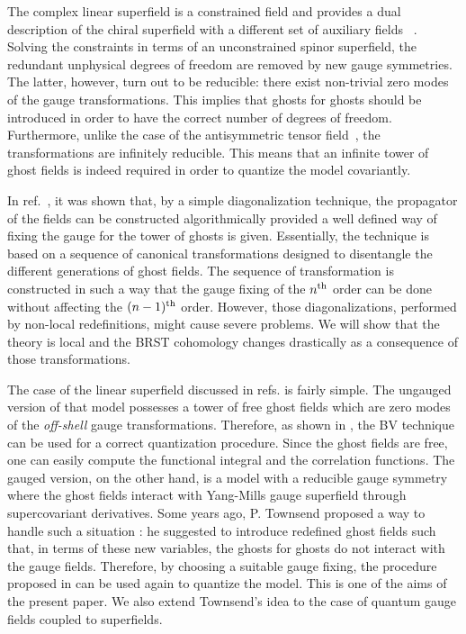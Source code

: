 \documentclass[a4paper,12pt]{article}
\begin{document}
The complex linear superfield is a constrained field and provides a
dual description of the chiral superfield with a different set of
auxiliary fields ~\cite{gates,superspace,WZNW,YMSG,Deo}.  Solving the
constraints in terms of an unconstrained spinor superfield, the
redundant unphysical degrees of freedom are removed by new gauge
symmetries. The latter, however, turn out to be reducible: there exist
non-trivial zero modes of the gauge transformations.  This implies
that ghosts for ghosts should be introduced in order to have the
correct number of degrees of freedom. Furthermore, unlike the case of
the antisymmetric tensor field~\cite{AT}, the transformations are
infinitely reducible. This means that an infinite tower of ghost
fields is indeed required in order to quantize the model covariantly.

In ref.~\cite{GPZ}, it was shown that, by a simple diagonalization
technique, the propagator of the fields can be constructed
algorithmically provided a well defined way of fixing the gauge for
the tower of ghosts is given. Essentially, the technique is based on a
sequence of canonical transformations designed to disentangle the
different generations of ghost fields. The sequence of transformation
is constructed in such a way that the gauge fixing of the $n^{\rm th}$ order
can be done without affecting the $(n-1)^{\rm th}$ order.  However, those
diagonalizations, performed by non-local redefinitions, might cause
severe problems. We will show that the theory is local and the
BRST cohomology changes drastically as a consequence of those
transformations.

The case of the linear superfield discussed in refs. \cite{GPZ,PZ} is
fairly simple. The ungauged version of that model possesses a tower of
free ghost fields which are zero modes of the {\it off-shell} gauge
transformations.  Therefore, as shown in \cite{GPZ}, the BV technique
can be used for a correct quantization procedure. Since the ghost
fields are free, one can easily compute the functional integral and
the correlation functions. The gauged version, on the other hand, is a
model with a reducible gauge symmetry where the ghost fields interact
with Yang-Mills gauge superfield through supercovariant derivatives.
Some years ago, P.  Townsend proposed a way to handle such a situation
\cite{3lectures}: he suggested to introduce redefined ghost fields
such that, in terms of these new variables, the ghosts for ghosts do
not interact with the gauge fields. Therefore, by choosing a suitable
gauge fixing, the procedure proposed in \cite{GPZ} can be used again
to quantize the model. This is one of the aims of the present paper.
We also extend Townsend's idea to the case of quantum gauge fields
coupled to superfields.
\end{document}
